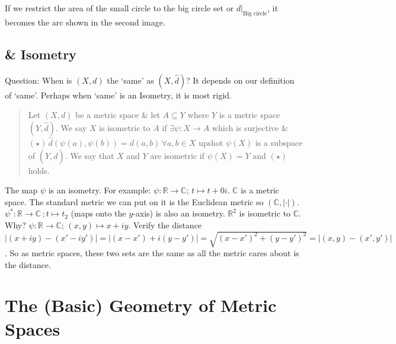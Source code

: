 \documentclass[10pt]{article}
\begin{document}
If we restrict the area of the small circle to the big circle set or $d|_{\text{Big circle}}$, it becomes the arc shown in the second image. 

\subsection{\& Isometry}
Question: When is $(X,d)$ the `same' as $(X,\hat{d})$? It depends on our definition of `same'. Perhaps when `same' is an Isometry, it is most rigid.
\begin{quote}
    Let $(X,d)$ be a metric space \& let $A\subseteq Y$ where $Y$ is a metric space $(Y,\hat{d})$. We say $X$ is isometric to $A$ if $\exists\psi:X\to A$ which is surjective \& $(\star)\,\hat{d}(\psi(a), \psi(b))=d(a,b)\,\forall a,b\in X$ upshot $\psi(X)$ is a subspace of $(Y,\hat{d})$. We say that $X$ and $Y$ are isometric if $\psi(X)=Y$ and $(\star)$ holds.
\end{quote}
The map $\psi$ is an isometry. For example: $\psi:\mathbb{R}\to\mathbb{C};\,t\mapsto t+0i$. $\mathbb{C}$ is a metric space. The standard metric we can put on it is the Euclidean metric so $(\mathbb{C}, |\cdot|)$. $\psi^{*}:\mathbb{R}\to\mathbb{C}\,;t\mapsto t_{2}$ (maps onto the $y$-axis) is also an isometry. $\mathbb{R}^{2}$ is isometric to $\mathbb{C}$. Why? $\psi:\mathbb{R}\to\mathbb{C};\,(x,y)\mapsto x+iy$. Verify the distance $|(x+iy)-(x'-iy')|=|(x-x')+i(y-y')|=\sqrt{(x-x')^{2}+(y-y')^{2}}=|(x,y)-(x',y')|$. So as metric spaces, these two sets are the same as all the metric cares about is the distance. 

\newpage

\section{The (Basic) Geometry of Metric Spaces}
\end{document}

